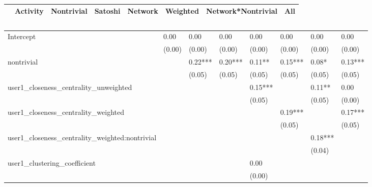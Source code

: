 \begin{table}
\caption{}
\begin{center}
\begin{tabular}{lccccccc}
\hline
                                               & Activity & Nontrivial & Satoshi & Network & Weighted & Network*Nontrivial &   All    \\
\hline
\hline
\end{tabular}
\begin{tabular}{llllllll}
Intercept                                      & 0.00     & 0.00       & 0.00    & 0.00    & 0.00     & 0.00               & 0.00     \\
                                               & (0.00)   & (0.00)     & (0.00)  & (0.00)  & (0.00)   & (0.00)             & (0.00)   \\
nontrivial                                     &          & 0.22***    & 0.20*** & 0.11**  & 0.15***  & 0.08*              & 0.13***  \\
                                               &          & (0.05)     & (0.05)  & (0.05)  & (0.05)   & (0.05)             & (0.05)   \\
user1_closeness_centrality_unweighted          &          &            &         & 0.15*** &          & 0.11**             & 0.00     \\
                                               &          &            &         & (0.05)  &          & (0.05)             & (0.00)   \\
user1_closeness_centrality_weighted            &          &            &         &         & 0.19***  &                    & 0.17***  \\
                                               &          &            &         &         & (0.05)   &                    & (0.05)   \\
user1_closeness_centrality_weighted:nontrivial &          &            &         &         &          & 0.18***            &          \\
                                               &          &            &         &         &          & (0.04)             &          \\
user1_clustering_coefficient                   &          &            &         & 0.00    &          &                    &          \\
                                               &          &            &         & (0.00)  &          &                    &          \\

\end{tabular}
\end{center}
\end{table}
